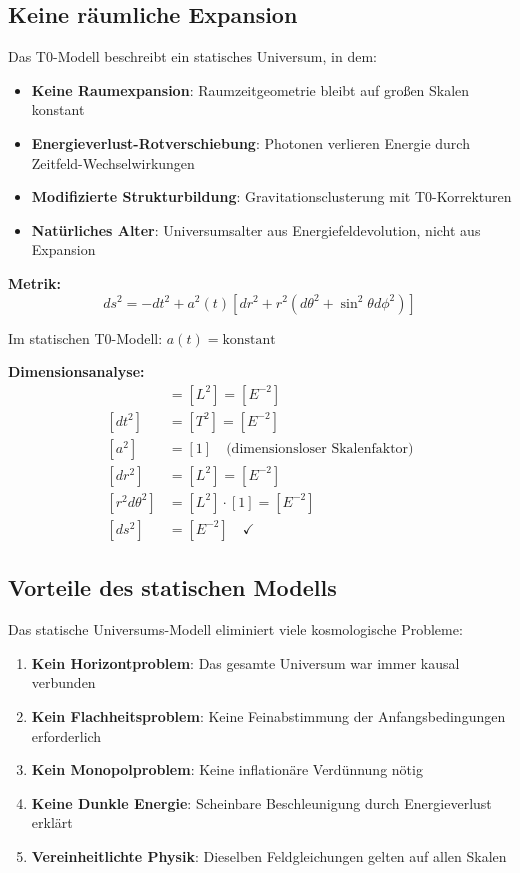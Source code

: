 \documentclass[12pt,a4paper]{report}
\begin{document}
	\subsection{Keine räumliche Expansion}
	\label{subsec:no_spatial_expansion}
	
	Das T0-Modell beschreibt ein statisches Universum, in dem:
	\begin{itemize}
		\item \textbf{Keine Raumexpansion}: Raumzeitgeometrie bleibt auf großen Skalen konstant
		\item \textbf{Energieverlust-Rotverschiebung}: Photonen verlieren Energie durch Zeitfeld-Wechselwirkungen
		\item \textbf{Modifizierte Strukturbildung}: Gravitationsclusterung mit T0-Korrekturen
		\item \textbf{Natürliches Alter}: Universumsalter aus Energiefeldevolution, nicht aus Expansion
	\end{itemize}
	
	\textbf{Metrik:}
	\begin{equation}
		ds^2 = -dt^2 + a^2(t)[dr^2 + r^2(d\theta^2 + \sin^2\theta d\phi^2)]
	\end{equation}
	
	Im statischen T0-Modell: $a(t) = \text{konstant}$
	
	\textbf{Dimensionsanalyse:}
	\begin{align}
		[ds^2] &= [L^2] = [E^{-2}] \\
		[dt^2] &= [T^2] = [E^{-2}] \\
		[a^2] &= [1] \quad \text{(dimensionsloser Skalenfaktor)} \\
		[dr^2] &= [L^2] = [E^{-2}] \\
		[r^2 d\theta^2] &= [L^2] \cdot [1] = [E^{-2}] \\
		[ds^2] &= [E^{-2}] \quad \checkmark
	\end{align}
	
	\subsection{Vorteile des statischen Modells}
	\label{subsec:advantages_static}
	
	Das statische Universums-Modell eliminiert viele kosmologische Probleme:
	\begin{enumerate}
		\item \textbf{Kein Horizontproblem}: Das gesamte Universum war immer kausal verbunden
		\item \textbf{Kein Flachheitsproblem}: Keine Feinabstimmung der Anfangsbedingungen erforderlich
		\item \textbf{Kein Monopolproblem}: Keine inflationäre Verdünnung nötig
		\item \textbf{Keine Dunkle Energie}: Scheinbare Beschleunigung durch Energieverlust erklärt
		\item \textbf{Vereinheitlichte Physik}: Dieselben Feldgleichungen gelten auf allen Skalen
	\end{enumerate}
	
\end{document}
